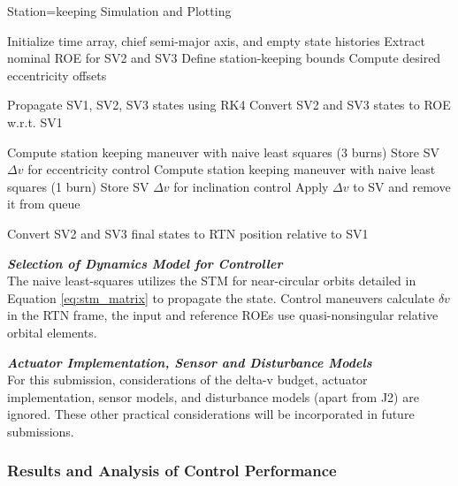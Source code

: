 \begin{algorithm}[H]
\caption{Station=keeping Simulation and Plotting}
\begin{algorithmic}[1]

\State Initialize time array, chief semi-major axis, and empty state histories
\State Extract nominal ROE for SV2 and SV3
\State Define station-keeping bounds
\State Compute desired eccentricity offsets

    \State Propagate SV1, SV2, SV3 states using RK4
    \State Convert SV2 and SV3 states to ROE w.r.t. SV1

            \State Compute station keeping maneuver with naive least squares (3 burns)
            \State Store SV $\Delta v$ for eccentricity control
        \EndIf
            \State Compute station keeping maneuver with naive least squares (1 burn)
            \State Store SV $\Delta v$ for inclination control
        \EndIf
    \EndIf
        \State Apply $\Delta v$ to SV and remove it from queue
    \EndIf
\EndFor

\State Convert SV2 and SV3 final states to RTN position relative to SV1\EndProcedure
\end{algorithmic}
\end{algorithm} \label{alg:station_keeping}

\textbf{\textit{Selection of Dynamics Model for Controller}} \\
The naive least-squares utilizes the STM for near-circular orbits detailed in Equation \ref{eq:stm_matrix} to propagate the state. Control maneuvers calculate $\delta v$ in the RTN frame, the input and reference ROEs use quasi-nonsingular relative orbital elements.

\textbf{\textit{Actuator Implementation, Sensor and Disturbance Models}} \\
For this submission, considerations of the delta-v budget, actuator implementation, sensor models, and disturbance models (apart from J2) are ignored. These other practical considerations will be incorporated in future submissions.

\subsubsection{Results and Analysis of Control Performance} \label{sec:analysis_of_control}

